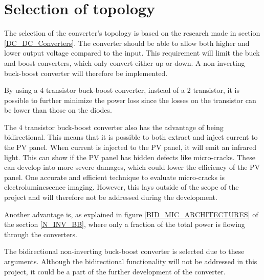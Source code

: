 \section{Selection of topology}
The selection of the converter's topology is based on the research made in section \ref{DC_DC_Converters}. The converter should be able to allow both higher and lower output voltage compared to the input. This requirement will limit the buck and boost converters, which only convert either up or down. A non-inverting buck-boost converter will therefore be implemented.

By using a 4 transistor buck-boost converter, instead of a 2 transistor, it is possible to further minimize the power loss since the losses on the transistor can be lower than those on the diodes.

The 4 transistor buck-boost converter also has the advantage of being bidirectional. This means that it is possible to both extract and inject current to the PV panel. When current is injected to the PV panel, it will emit an infrared light. This can show if the PV panel has hidden defects like micro-cracks. These can develop into more severe damages, which could lower the efficiency of the PV panel. One accurate and efficient technique to evaluate micro-cracks is electroluminescence imaging. However, this lays outside of the scope of the project and will therefore not be addressed during the development. \cite{Electroluminescence}



Another advantage is, as explained in figure \ref{BID_MIC_ARCHITECTURES} of the section \ref{N_INV_BB}, where only a fraction of the total power is flowing through the converters.

The bidirectional non-inverting buck-boost converter is selected due to these arguments. Although the bidirectional functionality will not be addressed in this project, it could be a part of the further development of the converter. 






 